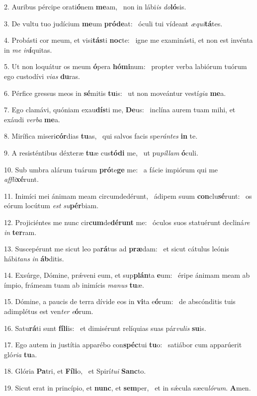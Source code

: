 2. Auribus pércipe orati\textbf{ó}nem \textbf{me}am, \ast\  non in lábi\textit{is} \textit{do}\textbf{ló}sis.\

3. De vultu tuo judícium \textbf{me}um \textbf{pród}\textbf{e}at: \ast\  óculi tui vídeant \textit{æ}\textit{qui}\textbf{tá}tes.\

4. Probásti cor meum, et visi\textbf{tás}ti \textbf{noc}te: \ast\  igne me examinásti, et non est invénta in \textit{me} \textit{in}\textbf{í}quitas.\

5. Ut non loquátur os meum \textbf{ó}pera \textbf{hó}\textbf{mi}num: \ast\  propter verba labiórum tuórum ego custodívi \textit{vi}\textit{as} \textbf{du}ras.\

6. Pérfice gressus meos in \textbf{sé}mitis \textbf{tu}is: \ast\  ut non moveántur vestí\textit{gi}\textit{a} \textbf{me}a.\

7. Ego clamávi, quóniam exau\textbf{dís}ti me, \textbf{De}us: \ast\  inclína aurem tuam mihi, et exáudi \textit{ver}\textit{ba} \textbf{me}a.\

8. Mirífica miseri\textbf{cór}dias \textbf{tu}as, \ast\  qui salvos facis spe\textit{rán}\textit{tes} \textbf{in} te.\

9. A resisténtibus déxteræ \textbf{tu}æ cus\textbf{tó}\textbf{di} me, \ast\  ut pu\textit{píl}\textit{lam} \textbf{ó}culi.\

10. Sub umbra alárum tuárum \textbf{pró}te\textbf{ge} me: \ast\  a fácie impiórum qui me \textit{af}\textit{fli}\textbf{xé}runt.\

11. Inimíci mei ánimam meam circumdedérunt, \dag\  ádipem suum \textbf{con}clu\textbf{sé}runt: \ast\  os eórum locútum \textit{est} \textit{su}\textbf{pér}biam.\

12. Projiciéntes me nunc cir\textbf{cum}de\textbf{dé}\textbf{runt} me: \ast\  óculos suos statuérunt decliná\textit{re} \textit{in} \textbf{ter}ram.\

13. Suscepérunt me sicut leo pa\textbf{rá}tus ad \textbf{præ}dam: \ast\  et sicut cátulus leónis hábi\textit{tans} \textit{in} \textbf{áb}ditis.\

14. Exsúrge, Dómine, prǽveni eum, et sup\textbf{plán}ta \textbf{e}um: \ast\  éripe ánimam meam ab ímpio, frámeam tuam ab inimícis \textit{ma}\textit{nus} \textbf{tu}æ.\

15. Dómine, a paucis de terra dívide eos in \textbf{vi}ta e\textbf{ó}rum: \ast\  de abscónditis tuis adimplétus est ven\textit{ter} \textit{e}\textbf{ó}rum.\

16. Satu\textbf{rá}ti sunt \textbf{fí}\textbf{li}is: \ast\  et dimisérunt relíquias suas pár\textit{vu}\textit{lis} \textbf{su}is.\

17. Ego autem in justítia apparébo con\textbf{spéc}tui \textbf{tu}o: \ast\  satiábor cum apparúerit gló\textit{ri}\textit{a} \textbf{tu}a.\

18. Glória \textbf{Pa}tri, et \textbf{Fí}\textbf{li}o, \ast\  et Spirí\textit{tu}\textit{i} \textbf{Sanc}to.\

19. Sicut erat in princípio, et \textbf{nunc}, et \textbf{sem}per, \ast\  et in sǽcula sæcu\textit{ló}\textit{rum}. \textbf{A}men.\

